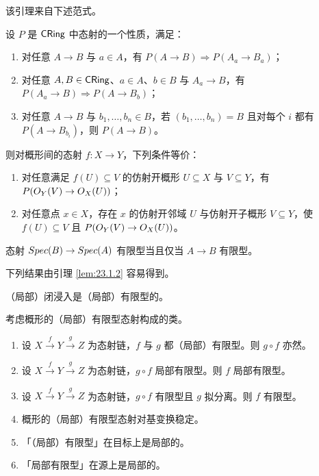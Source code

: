 该引理来自下述范式。

\begin{exercise}\label{exc:23.1.3}
设 $P$ 是 $\mathsf{CRing}$ 中态射的一个性质，满足：
\begin{enumerate}[label=(\roman*),leftmargin=2em,itemsep=0.25ex]
  \item 对任意 $A \to B$ 与 $a \in A$，有 $P(A \to B) \Rightarrow P(A_a \to B_a)$；
  \item 对任意 $A, B \in \mathsf{CRing}$、$a \in A$、$b \in B$ 与 $A_a \to B$，有 $P(A_a \to B) \Rightarrow P(A \to B_b)$；
  \item 对任意 $A \to B$ 与 $b_1, \dots, b_n \in B$，若 $(b_1, \dots, b_n) = B$ 且对每个 $i$ 都有 $P(A \to B_{b_i})$，则 $P(A \to B)$。
\end{enumerate}
则对概形间的态射 $f\colon X \to Y$，下列条件等价：
\begin{enumerate}[label=(\roman*),leftmargin=2em,itemsep=0.25ex]
  \item 对任意满足 $f(U) \subseteq V$ 的仿射开概形 $U \subseteq X$ 与 $V \subseteq Y$，有 $P(O_Y(V) \to O_X(U))$；
  \item 对任意点 $x \in X$，存在 $x$ 的仿射开邻域 $U$ 与仿射开子概形 $V \subseteq Y$，使 $f(U) \subseteq V$ 且 $P(O_Y(V) \to O_X(U))$。
\end{enumerate}
\end{exercise}

\begin{corollary}\label{cor:23.1.4}
态射 $Spec(B) \to Spec(A)$ 有限型当且仅当 $A \to B$ 有限型。
\end{corollary}

下列结果由引理 \ref{lem:23.1.2} 容易得到。

\begin{corollary}\label{cor:23.1.5}
（局部）闭浸入是（局部）有限型的。
\end{corollary}

\begin{lemma}\label{lem:23.1.6}
考虑概形的（局部）有限型态射构成的类。
\begin{enumerate}[label=(\roman*),leftmargin=2em,itemsep=0.25ex]
  \item 设 $X \xrightarrow{f} Y \xrightarrow{g} Z$ 为态射链，$f$ 与 $g$ 都（局部）有限型。则 $g \circ f$ 亦然。
  \item 设 $X \xrightarrow{f} Y \xrightarrow{g} Z$ 为态射链，$g \circ f$ 局部有限型。则 $f$ 局部有限型。
  \item[(ii')] 设 $X \xrightarrow{f} Y \xrightarrow{g} Z$ 为态射链，$g \circ f$ 有限型且 $g$ 拟分离。则 $f$ 有限型。
  \item 概形的（局部）有限型态射对基变换稳定。
  \item 「（局部）有限型」在目标上是局部的。
  \item 「局部有限型」在源上是局部的。
\end{enumerate}
\end{lemma}


